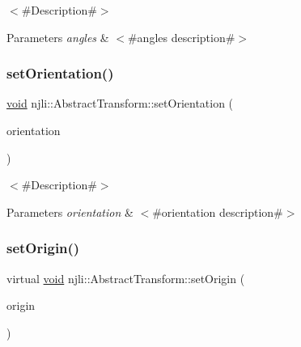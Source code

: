 $<$\#\+Description\#$>$


\begin{DoxyParams}{Parameters}
{\em angles} & $<$\#angles description\#$>$ \\
\hline
\end{DoxyParams}
\mbox{\label{classnjli_1_1_abstract_transform_a8668e1e13020412115e65b7e50176262}} 
\subsubsection{\texorpdfstring{set\+Orientation()}{setOrientation()}}
{\footnotesize\ttfamily \mbox{\hyperlink{_thread_8h_af1e856da2e658414cb2456cb6f7ebc66}{void}} njli\+::\+Abstract\+Transform\+::set\+Orientation (\begin{DoxyParamCaption}\item[{const bt\+Quaternion \&}]{orientation }\end{DoxyParamCaption})}

$<$\#\+Description\#$>$


\begin{DoxyParams}{Parameters}
{\em orientation} & $<$\#orientation description\#$>$ \\
\hline
\end{DoxyParams}
\mbox{\label{classnjli_1_1_abstract_transform_a8dfc3a81836971418bb9c71004222c8f}} 
\subsubsection{\texorpdfstring{set\+Origin()}{setOrigin()}\hspace{0.1cm}{\footnotesize\ttfamily [1/2]}}
{\footnotesize\ttfamily virtual \mbox{\hyperlink{_thread_8h_af1e856da2e658414cb2456cb6f7ebc66}{void}} njli\+::\+Abstract\+Transform\+::set\+Origin (\begin{DoxyParamCaption}\item[{const bt\+Vector3 \&}]{origin }\end{DoxyParamCaption})\hspace{0.3cm}{\ttfamily [virtual]}}

